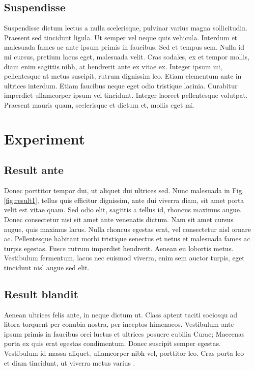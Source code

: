 \documentclass[11pt,oneside,openright]{book}
\begin{document}
\section{Suspendisse}

Suspendisse dictum lectus a nulla scelerisque, pulvinar varius magna sollicitudin. Praesent sed tincidunt ligula. Ut semper vel neque quis vehicula. Interdum et malesuada fames ac ante ipsum primis in faucibus. Sed et tempus sem. Nulla id mi cursus, pretium lacus eget, malesuada velit. Cras sodales, ex et tempor mollis, diam enim sagittis nibh, at hendrerit ante ex vitae ex. Integer ipsum mi, pellentesque at metus suscipit, rutrum dignissim leo. Etiam elementum ante in ultrices interdum. Etiam faucibus neque eget odio tristique lacinia. Curabitur imperdiet ullamcorper ipsum vel tincidunt. Integer laoreet pellentesque volutpat. Praesent mauris quam, scelerisque et dictum et, mollis eget mi.


\chapter{Experiment}\label{cpt:exp}

\section{Result ante}

Donec porttitor tempor dui, ut aliquet dui ultrices sed. Nunc malesuada in Fig.\ref{fig:result1}, tellus quis efficitur dignissim, ante dui viverra diam, sit amet porta velit est vitae quam. Sed odio elit, sagittis a tellus id, rhoncus maximus augue. Donec consectetur nisi sit amet ante venenatis dictum. Nam sit amet cursus augue, quis maximus lacus. Nulla rhoncus egestas erat, vel consectetur nisl ornare ac. Pellentesque habitant morbi tristique senectus et netus et malesuada fames ac turpis egestas. Fusce rutrum imperdiet hendrerit. Aenean eu lobortis metus. Vestibulum fermentum, lacus nec euismod viverra, enim sem auctor turpis, eget tincidunt nisl augue sed elit.


\section{Result blandit}

Aenean ultrices felis ante, in neque dictum ut. Class aptent taciti sociosqu ad litora torquent per conubia nostra, per inceptos himenaeos. Vestibulum ante ipsum primis in faucibus orci luctus et ultrices posuere cubilia Curae; Maecenas porta ex quis erat egestas condimentum. Donec suscipit semper egestas. Vestibulum id massa aliquet, ullamcorper nibh vel, porttitor leo. Cras porta leo et diam tincidunt, ut viverra metus varius .
\end{document}
